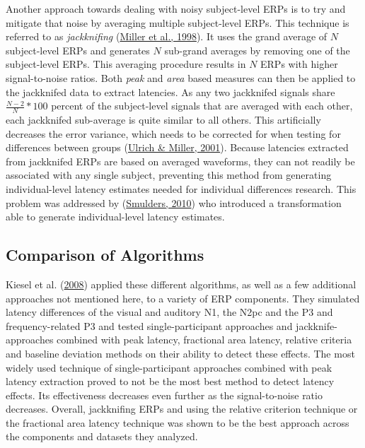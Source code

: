\documentclass[
  man]{apa7}
\begin{document}
Another approach towards dealing with noisy subject-level ERPs is to try and mitigate that noise by averaging multiple subject-level ERPs. This technique is referred to as \emph{jackknifing} (\protect\hyperlink{ref-miller1998jackknife}{Miller et al., 1998}). It uses the grand average of \(N\) subject-level ERPs and generates \(N\) sub-grand averages by removing one of the subject-level ERPs. This averaging procedure results in \(N\) ERPs with higher signal-to-noise ratios. Both \emph{peak} and \emph{area} based measures can then be applied to the jackknifed data to extract latencies. As any two jackknifed signals share \(\frac{N-2}{N} * 100\) percent of the subject-level signals that are averaged with each other, each jackknifed sub-average is quite similar to all others. This artificially decreases the error variance, which needs to be corrected for when testing for differences between groups (\protect\hyperlink{ref-ulrich2001using}{Ulrich \& Miller, 2001}). Because latencies extracted from jackknifed ERPs are based on averaged waveforms, they can not readily be associated with any single subject, preventing this method from generating individual-level latency estimates needed for individual differences research. This problem was addressed by (\protect\hyperlink{ref-smulders2010simplifying}{Smulders, 2010}) who introduced a transformation able to generate individual-level latency estimates.

\hypertarget{comparison-of-algorithms}{%
\subsection{Comparison of Algorithms}\label{comparison-of-algorithms}}

Kiesel et al. (\protect\hyperlink{ref-kiesel2008measurement}{2008}) applied these different algorithms, as well as a few additional approaches not mentioned here, to a variety of ERP components. They simulated latency differences of the visual and auditory N1, the N2pc and the P3 and frequency-related P3 and tested single-participant approaches and jackknife-approaches combined with peak latency, fractional area latency, relative criteria and baseline deviation methods on their ability to detect these effects. The most widely used technique of single-participant approaches combined with peak latency extraction proved to not be the most best method to detect latency effects. Its effectiveness decreases even further as the signal-to-noise ratio decreases. Overall, jackknifing ERPs and using the relative criterion technique or the fractional area latency technique was shown to be the best approach across the components and datasets they analyzed.
\end{document}
